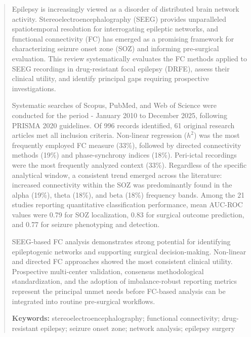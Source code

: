 \documentclass[12pt]{article}
\begin{document}
\begin{abstract}
  \noindent
  Epilepsy is increasingly viewed as a disorder of distributed brain network activity. Stereoelectroencephalography (SEEG) provides unparalleled spatiotemporal resolution for interrogating epileptic networks, and functional connectivity (FC) has emerged as a promising framework for characterizing seizure onset zone (SOZ) and informing pre-surgical evaluation. This review systematically evaluates the FC methods applied to SEEG recordings in drug-resistant focal epilepsy (DRFE), assess their clinical utility, and identify principal gaps requiring prospective investigations.
  
  \noindent
  Systematic searches of Scopus, PubMed, and Web of Science were conducted for the period - January 2010 to December 2025, following PRISMA 2020 guidelines. Of 996 records identified, 61 original research articles met all inclusion criteria. Non-linear regression ($h^2$) was the most frequently employed FC measure (33\%), followed by directed connectivity methods (19\%) and phase-synchrony indices (18\%). Peri-ictal recordings were the most frequently analyzed context (33\%). Regardless of the specific analytical window, a consistent trend emerged across the literature: increased connectivity within the SOZ was predominantly found in the alpha (19\%), theta (18\%), and beta (18\%) frequency bands. Among the 21 studies reporting quantitative classification performance, mean AUC-ROC values were 0.79 for SOZ localization, 0.83 for surgical outcome prediction, and 0.77 for seizure phenotyping and detection.
  
  \noindent
  SEEG-based FC analysis demonstrates strong potential for identifying epileptogenic networks and supporting surgical decision-making. Non-linear and directed FC approaches showed the most consistent clinical utility. Prospective multi-center validation, consensus methodological standardization, and the adoption of imbalance-robust reporting metrics represent the principal unmet needs before FC-based analysis can be integrated into routine pre-surgical workflows.
  
  
\vspace{1em}
\noindent
\textbf{Keywords:}
stereoelectroencephalography; functional connectivity; drug-resistant
epilepsy; seizure onset zone; network analysis;
epilepsy surgery
\end{abstract}
\end{document}
